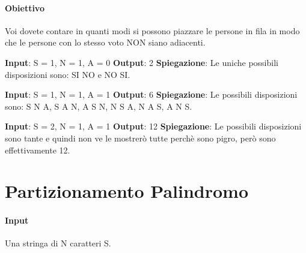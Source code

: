     \paragraph{Obiettivo} Voi dovete contare in quanti modi si possono piazzare le persone in fila in modo che le persone con lo stesso voto NON siano adiacenti.
    \begin{esempio}
        \newline
        \textbf{Input}: S = 1, N = 1, A = 0
        \newline
        \textbf{Output}: 2
        \newline
        \textbf{Spiegazione}: Le uniche possibili disposizioni sono: SI NO e NO SI.
    \end{esempio}
    \begin{esempio}
        \newline
        \textbf{Input}: S = 1, N = 1, A = 1
        \newline
        \textbf{Output}: 6
        \newline
        \textbf{Spiegazione}: Le possibili disposizioni sono: S N A, S A N, A S N, N S A, N A S, A N S.
    \end{esempio}
    \begin{esempio}
        \newline
        \textbf{Input}: S = 2, N = 1, A = 1
        \newline
        \textbf{Output}: 12
        \newline
        \textbf{Spiegazione}: Le possibili disposizioni sono tante e quindi non ve le mostrerò tutte perchè sono pigro, però sono effettivamente 12.
    \end{esempio}

\newpage
\thispagestyle{chapterInit}
\section*{Partizionamento Palindromo}
    \paragraph{Input} Una stringa di N caratteri S.
